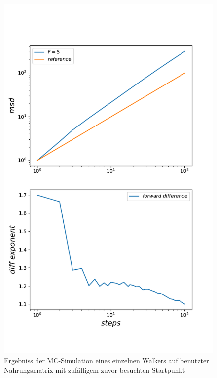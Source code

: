 \documentclass[a4paper, 12pt]{scrartcl}
\begin{document}
\begin{figure}[H]
	\centering
	\includegraphics[scale=0.8]{single_walker_on_used_mat_disorderavg.pdf}
	\caption{Ergebniss der MC-Simulation eines einzelnen Walkers auf benutzter Nahrungsmatrix mit zufälligem zuvor besuchten Startpunkt}
\end{figure}

\newpage
\end{document}
